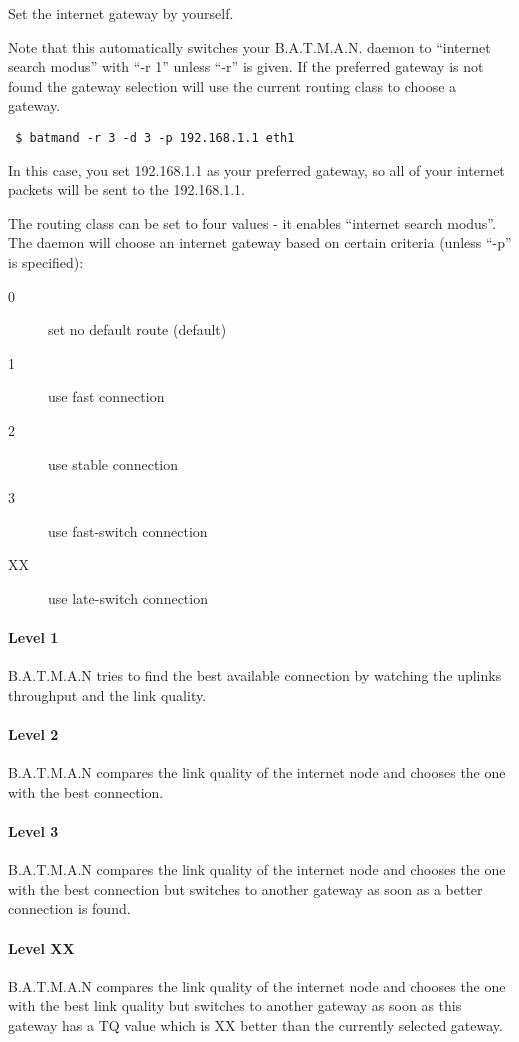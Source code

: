 Set the internet gateway by yourself.

Note that this automatically switches your B.A.T.M.A.N. daemon to ``internet
search modus'' with ``-r 1'' unless ``-r'' is given. If the preferred gateway is not
found the gateway selection will use the current routing class to choose a
gateway.

\begin{verbatim}
 $ batmand -r 3 -d 3 -p 192.168.1.1 eth1
\end{verbatim}
In this case, you set 192.168.1.1 as your preferred gateway, so all of your
internet packets will be sent to the 192.168.1.1.

The routing class can be set to four values - it enables ``internet search
modus''. The daemon will choose an internet gateway based on certain criteria
(unless ``-p'' is specified):
\begin{description}
\item[0] set no default route (default)
\item[1] use fast connection
\item[2] use stable connection
\item[3] use fast-switch connection
\item[XX] use late-switch connection
\end{description}

\paragraph*{Level 1}
B.A.T.M.A.N tries to find the best available connection by watching the uplinks
throughput and the link quality.

\paragraph*{Level 2}
B.A.T.M.A.N compares the link quality of the internet node and chooses the one
with the best connection.

\paragraph*{Level 3}
B.A.T.M.A.N compares the link quality of the internet node and chooses the one
with the best connection but switches to another gateway as soon as a better
connection is found.

\paragraph*{Level XX}
B.A.T.M.A.N compares the link quality of the internet node and chooses the one
with the best link quality but switches to another gateway as soon as this
gateway has a TQ value which is XX better than the currently selected gateway.

